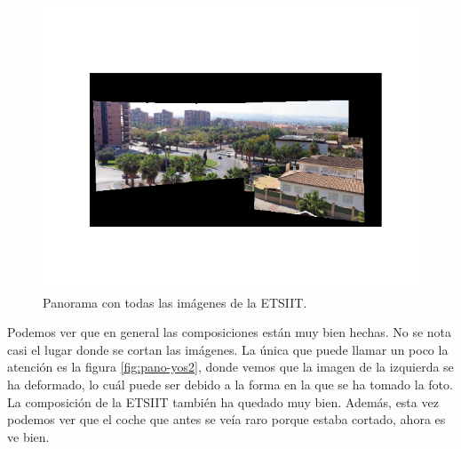 \documentclass[11pt,a4paper]{article}
\begin{document}
\begin{figure}[H]
	\centering
	\includegraphics[scale=0.7]{img/pano-etsiit}
	\caption{Panorama con todas las imágenes de la ETSIIT.}
	\label{fig:pano-etsiit}
\end{figure}

Podemos ver que en general las composiciones están muy bien hechas. No se nota casi el lugar donde se
cortan las imágenes. La única que puede llamar un poco la atención es la figura \ref{fig:pano-yos2}, donde
vemos que la imagen de la izquierda se ha deformado, lo cuál puede ser debido a la forma en la que
se ha tomado la foto. La composición de la ETSIIT también ha quedado muy bien. Además,
esta vez podemos ver que el coche que antes se veía raro porque estaba cortado, ahora es ve
bien.

\newpage



\end{document}
